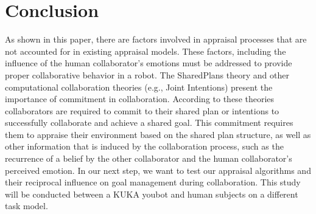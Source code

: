 \documentclass{article}
\begin{document}
\section{Conclusion}
\vspace{-1mm}
As shown in this paper, there are factors involved in appraisal processes
that are not accounted for in existing appraisal models. These factors,
including the influence of the human collaborator's emotions must be addressed
to provide proper collaborative behavior in a robot. The SharedPlans theory and
other computational collaboration theories (e.g., Joint Intentions) present the
importance of commitment in collaboration. According to these theories
collaborators are required to commit to their shared plan or intentions to
successfully collaborate and achieve a shared goal. This commitment requires
them to appraise their environment based on the shared plan structure, as well
as other information that is induced by the collaboration process, such as the
recurrence of a belief by the other collaborator and the human collaborator's
perceived emotion. In our next step, we want to test our appraisal algorithms
and their reciprocal influence on goal management during collaboration. This
study will be conducted between a KUKA youbot and human subjects on a different
task model.








\end{document}
